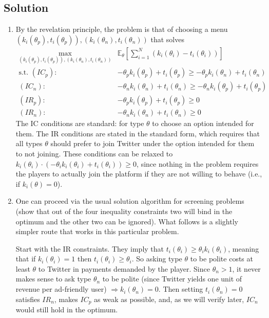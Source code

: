 \documentclass[a4paper]{article}
\newif\ifsolutions
\begin{document}
\ifsolutions
\subsection*{Solution}
\begin{enumerate}
	\item By the revelation principle, the problem is that of choosing a menu $(k_i(\theta_p), t_i(\theta_p)), (k_i(\theta_n), t_i(\theta_n))$ that solves
	\begin{align*}
		\max_{(k_i(\theta_p), t_i(\theta_p)), (k_i(\theta_n), t_i(\theta_n))} & \mathbb{E}_\theta \left[ \sum_{i=1}^N \left( k_i(\theta_i) - t_i(\theta_i) \right) \right] 
		\\
		\text{s.t. } (IC_p): & -\theta_p k_i(\theta_p) + t_i(\theta_p) \geq -\theta_p k_i(\theta_n) + t_i(\theta_n)
		\\
		(IC_n): & -\theta_n k_i(\theta_n) + t_i(\theta_n) \geq -\theta_n k_i(\theta_p) + t_i(\theta_p)
		\\
		(IR_p): & -\theta_p k_i(\theta_p) + t_i(\theta_p) \geq 0
		\\
		(IR_n): & -\theta_n k_i(\theta_n) + t_i(\theta_n) \geq 0
	\end{align*}
	The IC conditions are standard: for type $\theta$ to choose an option intended for them. The IR conditions are stated in the standard form, which requires that all types $\theta$ should prefer to join Twitter under the option intended for them to not joining. These conditions can be relaxed to $k_i(\theta_i) \cdot \left( -\theta_i k_i(\theta_i) + t_i(\theta_i) \right) \geq 0$, since nothing in the problem requires the players to actually join the platform if they are not willing to behave (i.e., if $k_i(\theta)=0$).
	
	\item One can proceed via the usual solution algorithm for screening problems (show that out of the four inequality constraints two will bind in the optimum and the other two can be ignored). What follows is a slightly simpler route that works in this particular problem.
	
	Start with the IR constraints. They imply that $t_i(\theta_i) \geq \theta_i k_i(\theta_i)$, meaning that if $k_i(\theta_i)=1$ then $t_i(\theta_i) \geq \theta_i$. So asking type $\theta$ to be polite costs at least $\theta$ to Twitter in payments demanded by the player. Since $\theta_n > 1$, it never makes sense to ask type $\theta_n$ to be polite (since Twitter yields one unit of revenue per ad-friendly user) $\Rightarrow k_i(\theta_n)=0$. Then setting $t_i(\theta_n)=0$ satisfies $IR_n$, makes $IC_p$ as weak as possible, and, as we will verify later, $IC_n$ would still hold in the optimum.
	

\end{enumerate}
\end{document}
